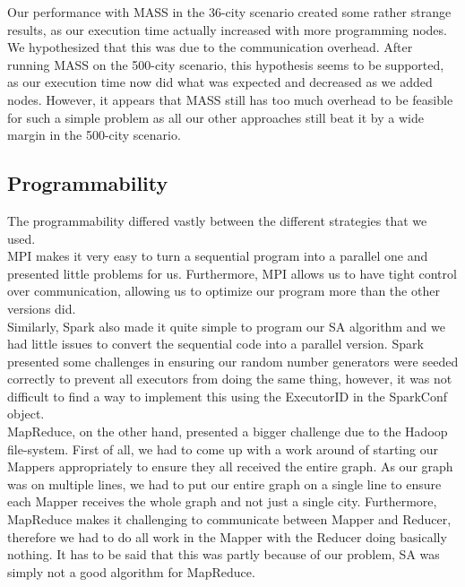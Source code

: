 \documentclass{article}
\begin{document}
            	Our performance with MASS in the 36-city scenario created some rather strange results, as our execution time actually increased with more programming nodes. We hypothesized that this was due to the communication overhead. After running MASS on the 500-city scenario, this hypothesis seems to be supported, as our execution time now did what was expected and decreased as we added nodes. However, it appears that MASS still has too much overhead to be feasible for such a simple problem as all our other approaches still beat it by a wide margin in the 500-city scenario. \\
		
		\subsection{Programmability} \label{PROG}
			The programmability differed vastly between the different strategies that we used. \\
			
			MPI makes it very easy to turn a sequential program into a parallel one and presented little problems for us. Furthermore, MPI allows us to have tight control over communication, allowing us to optimize our program more than the other versions did.\\
			
			Similarly, Spark also made it quite simple to program our SA algorithm and we had little issues to convert the sequential code into a parallel version. Spark presented some challenges in ensuring our random number generators were seeded correctly to prevent all executors from doing the same thing, however, it was not difficult to find a way to implement this using the ExecutorID in the SparkConf object. \\
			
			MapReduce, on the other hand, presented a bigger challenge due to the Hadoop file-system. First of all, we had to come up with a work around of starting our Mappers appropriately to ensure they all received the entire graph. As our graph was on multiple lines, we had to put our entire graph on a single line to ensure each Mapper receives the whole graph and not just a single city. Furthermore, MapReduce makes it challenging to communicate between Mapper and Reducer, therefore we had to do all work in the Mapper with the Reducer doing basically nothing. It has to be said that this was partly because of our problem, SA was simply not a good algorithm for MapReduce.\\
			
\end{document}
